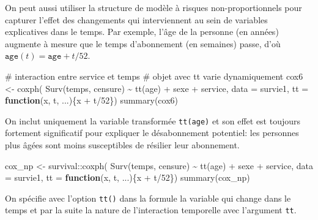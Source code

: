\documentclass[
  11pt,
  letterpaper,
]{scrbook}
\newenvironment{Shaded}{\begin{snugshade}}{\end{snugshade}}
\newcommand{\AttributeTok}[1]{\textcolor[rgb]{0.40,0.45,0.13}{#1}}
\newcommand{\CommentTok}[1]{\textcolor[rgb]{0.37,0.37,0.37}{#1}}
\newcommand{\ControlFlowTok}[1]{\textcolor[rgb]{0.00,0.23,0.31}{\textbf{#1}}}
\newcommand{\DecValTok}[1]{\textcolor[rgb]{0.68,0.00,0.00}{#1}}
\newcommand{\FunctionTok}[1]{\textcolor[rgb]{0.28,0.35,0.67}{#1}}
\newcommand{\NormalTok}[1]{\textcolor[rgb]{0.00,0.23,0.31}{#1}}
\newcommand{\OtherTok}[1]{\textcolor[rgb]{0.00,0.23,0.31}{#1}}
\newcommand{\SpecialCharTok}[1]{\textcolor[rgb]{0.37,0.37,0.37}{#1}}
\theoremstyle{definition}
\theoremstyle{remark}
\begin{document}
On peut aussi utiliser la structure de modèle à risques
non-proportionnels pour capturer l'effet des changements qui
interviennent au sein de variables explicatives dans le temps. Par
exemple, l'âge de la personne (en années) augmente à mesure que le temps
d'abonnement (en semaines) passe, d'où
\(\texttt{age}(t) = \texttt{age} + t/52\).

\begin{Shaded}
\begin{Highlighting}[]
\CommentTok{\# interaction entre service et temps}
\CommentTok{\# objet avec \textquotesingle{}tt\textquotesingle{} varie dynamiquement}
\NormalTok{cox6 }\OtherTok{\textless{}{-}} \FunctionTok{coxph}\NormalTok{(}
    \FunctionTok{Surv}\NormalTok{(temps, censure) }\SpecialCharTok{\textasciitilde{}} 
     \FunctionTok{tt}\NormalTok{(age) }\SpecialCharTok{+}\NormalTok{ sexe }\SpecialCharTok{+}\NormalTok{ service, }
     \AttributeTok{data =}\NormalTok{ survie1, }
     \AttributeTok{tt =} \ControlFlowTok{function}\NormalTok{(x, t, ...)\{x }\SpecialCharTok{+}\NormalTok{ t}\SpecialCharTok{/}\DecValTok{52}\NormalTok{\})}
\FunctionTok{summary}\NormalTok{(cox6)}
\end{Highlighting}
\end{Shaded}

On inclut uniquement la variable transformée \texttt{tt(age)} et son
effet est toujours fortement significatif pour expliquer le
désabonnement potentiel: les personnes plus âgées sont moins
susceptibles de résilier leur abonnement.

\begin{Shaded}
\begin{Highlighting}[]
\NormalTok{cox\_np }\OtherTok{\textless{}{-}}\NormalTok{ survival}\SpecialCharTok{::}\FunctionTok{coxph}\NormalTok{(}
    \FunctionTok{Surv}\NormalTok{(temps, censure) }\SpecialCharTok{\textasciitilde{}} 
     \FunctionTok{tt}\NormalTok{(age) }\SpecialCharTok{+}\NormalTok{ sexe }\SpecialCharTok{+}\NormalTok{ service, }
     \AttributeTok{data =}\NormalTok{ survie1, }
     \AttributeTok{tt =} \ControlFlowTok{function}\NormalTok{(x, t, ...)\{x }\SpecialCharTok{+}\NormalTok{ t}\SpecialCharTok{/}\DecValTok{52}\NormalTok{\})}
\FunctionTok{summary}\NormalTok{(cox\_np)}
\end{Highlighting}
\end{Shaded}

On spécifie avec l'option \texttt{tt()} dans la formule la variable qui
change dans le temps et par la suite la nature de l'interaction
temporelle avec l'argument \texttt{tt}.
\end{document}
